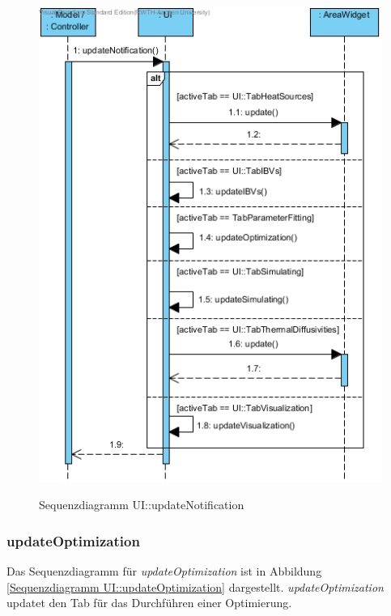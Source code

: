 \begin{figure}[H]
	\centering
	\includegraphics[scale=.55]{Bilder/UI__updateNotification().jpg}\\
	\caption{Sequenzdiagramm UI::updateNotification}
	\label{Sequenzdiagramm UI::updateNotification}
\end{figure}

\subsubsection*{updateOptimization}

Das Sequenzdiagramm für \emph{updateOptimization} ist in Abbildung \ref{Sequenzdiagramm UI::updateOptimization} dargestellt. \emph{updateOptimization} updatet den Tab für das Durchführen einer Optimierung.

